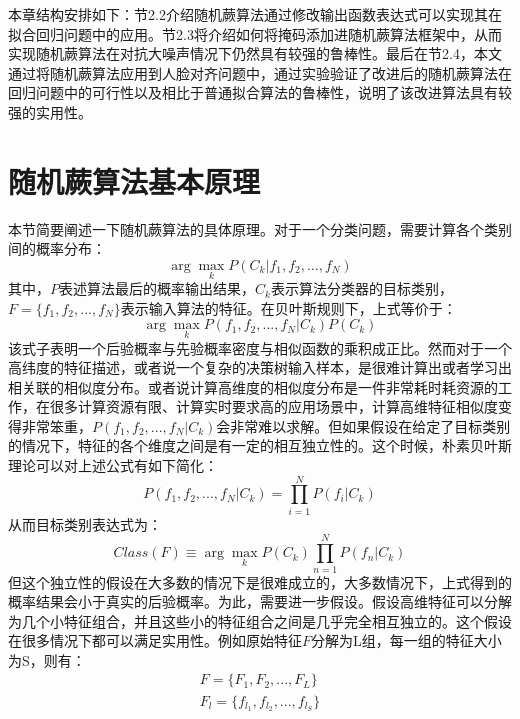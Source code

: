 本章结构安排如下：节2.2介绍随机蕨算法通过修改输出函数表达式可以实现其在拟合回归问题中的应用。节2.3将介绍如何将掩码添加进随机蕨算法框架中，从而实现随机蕨算法在对抗大噪声情况下仍然具有较强的鲁棒性。最后在节2.4，本文通过将随机蕨算法应用到人脸对齐问题中，通过实验验证了改进后的随机蕨算法在回归问题中的可行性以及相比于普通拟合算法的鲁棒性，说明了该改进算法具有较强的实用性。



\section{随机蕨算法基本原理}
本节简要阐述一下随机蕨算法的具体原理。对于一个分类问题，需要计算各个类别间的概率分布：
\begin{equation}
	\arg\max_{k} P(C_k|f_1,f_2,...,f_N)
\end{equation}
其中，$P$表述算法最后的概率输出结果，$C_k$表示算法分类器的目标类别，$F=\{f_1,f_2,...,f_N\}$表示输入算法的特征。在贝叶斯规则下，上式等价于：
\begin{equation}
	\arg\max_{k} P(f_1,f_2,...,f_N|C_k)P(C_k)
\end{equation}
该式子表明一个后验概率与先验概率密度与相似函数的乘积成正比。然而对于一个高纬度的特征描述，或者说一个复杂的决策树输入样本，是很难计算出或者学习出相关联的相似度分布。或者说计算高维度的相似度分布是一件非常耗时耗资源的工作，在很多计算资源有限、计算实时要求高的应用场景中，计算高维特征相似度变得非常笨重，$P(f_1,f_2,...,f_N|C_k)$会非常难以求解。但如果假设在给定了目标类别的情况下，特征的各个维度之间是有一定的相互独立性的。这个时候，朴素贝叶斯理论可以对上述公式有如下简化：
\begin{equation}
	P(f_1,f_2,...,f_N|C_k)=\prod_{i=1}^N P(f_i|C_k)
\end{equation}
从而目标类别表达式为：
\begin{equation}
	Class(F)\equiv \arg\max_k P(C_k)\prod_{n=1}^N P(f_n|C_k)
\end{equation}
但这个独立性的假设在大多数的情况下是很难成立的，大多数情况下，上式得到的概率结果会小于真实的后验概率。为此，需要进一步假设。假设高维特征可以分解为几个小特征组合，并且这些小的特征组合之间是几乎完全相互独立的。这个假设在很多情况下都可以满足实用性。例如原始特征$F$分解为L组，每一组的特征大小为S，则有：
\begin{equation}
\begin{aligned}
	F=\{F_1,F_2,...,F_L\} \\
	F_l=\{f_{l_1},f_{l_2},...,f_{l_S}\}
\end{aligned}
\end{equation}
